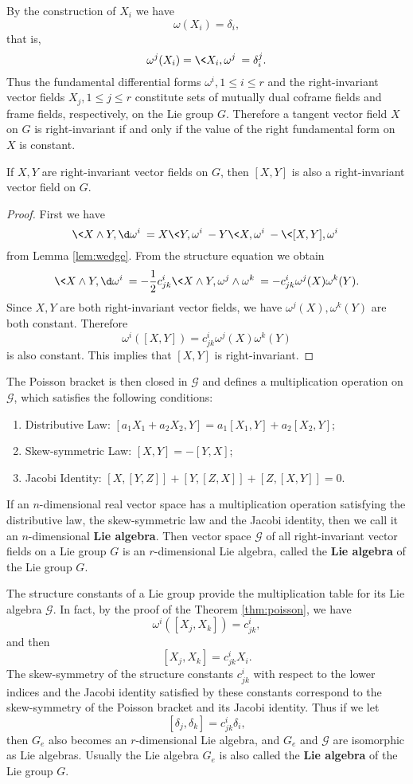 \documentclass[11pt]{article}
\begin{document}
By the construction of $X_i$ we have $$\omega(X_i) = \delta_i,$$ that is, $$\omega^j(X_i) = \<X_i, \omega^j\> = \delta^j_i.$$ Thus the fundamental differential forms $\omega^i, 1 \le i \le r$ and the right-invariant vector fields $X_j, 1 \le j \le r$ constitute sets of mutually dual coframe fields and frame fields, respectively, on the Lie group $G$. Therefore a tangent vector field $X$ on $G$ is right-invariant if and only if the value of the right fundamental form on $X$ is constant. 

\begin{theorem}\label{thm:poisson}
    If $X, Y$ are right-invariant vector fields on $G$, then $[X, Y]$ is also a right-invariant vector field on $G$.
\end{theorem}
\begin{proof}
    First we have $$\<X \wedge Y, \d\omega^i\> = X\<Y, \omega^i\> - Y\<X, \omega^i\> - \<[X, Y], \omega^i\>$$ from Lemma \ref{lem:wedge}. From the structure equation we obtain $$\<X \wedge Y, \d\omega^i\> = -\frac{1}{2}c^i_{jk}\<X \wedge Y, \omega^j \wedge \omega^k\> = -c^i_{jk}\omega^j(X)\omega^k(Y).$$ Since $X, Y$ are both right-invariant vector fields, we have $\omega^j(X), \omega^k(Y)$ are both constant. Therefore $$\omega^i([X, Y]) = c^i_{jk}\omega^j(X)\omega^k(Y)$$ is also constant. This implies that $[X, Y]$ is right-invariant.  
\end{proof}

The Poisson bracket is then closed in $\mathcal{G}$ and defines a multiplication operation on $\mathcal{G}$, which satisfies the following conditions:
\begin{enumerate}
    \item Distributive Law: $[a_1X_1 + a_2X_2, Y] = a_1[X_1, Y] + a_2[X_2, Y]$;
    \item Skew-symmetric Law: $[X, Y] = -[Y, X]$;
    \item Jacobi Identity: $[X, [Y, Z]] + [Y, [Z, X]] + [Z, [X, Y]] = 0$.
\end{enumerate}
If an $n$-dimensional real vector space has a multiplication operation satisfying the distributive law, the skew-symmetric law and the Jacobi identity, then we call it an $n$-dimensional \textbf{Lie algebra}. Then vector space $\mathcal{G}$ of all right-invariant vector fields on a Lie group $G$ is an $r$-dimensional Lie algebra, called the \textbf{Lie algebra} of the Lie group $G$.

The structure constants of a Lie group provide the multiplication table for its Lie algebra $\mathcal{G}$. In fact, by the proof of the Theorem \ref{thm:poisson}, we have $$\omega^i([X_j, X_k]) = c^i_{jk},$$ and then $$[X_j, X_k] = c^i_{jk}X_i.$$ The skew-symmetry of the structure constants $c^i_{jk}$ with respect to the lower indices and the Jacobi identity satisfied by these constants correspond to the skew-symmetry of the Poisson bracket and its Jacobi identity. Thus if we let $$[\delta_j, \delta_k] = c^i_{jk}\delta_i,$$ then $G_e$ also becomes an $r$-dimensional Lie algebra, and $G_e$ and $\mathcal{G}$ are isomorphic as Lie algebras. Usually the Lie algebra $G_e$ is also called the \textbf{Lie algebra} of the Lie group $G$. 
\end{document}

